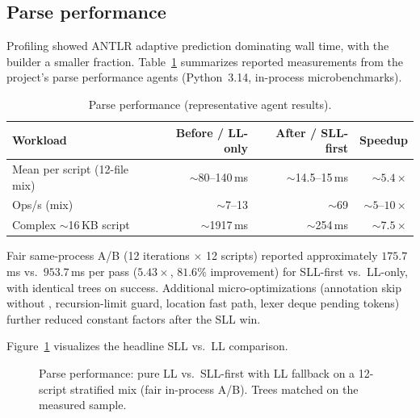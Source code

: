 \documentclass[11pt,a4paper]{article}
\begin{document}
\subsection{Parse performance}
\label{sec:eval-parse}

Profiling showed ANTLR adaptive prediction dominating wall time, with the
builder a smaller fraction. Table~\ref{tab:parse-perf} summarizes reported
measurements from the project's parse performance agents (Python~3.14,
in-process microbenchmarks).

\begin{table}[t]
\centering
\caption{Parse performance (representative agent results).}
\label{tab:parse-perf}
\small
\begin{tabular}{@{}lrrr@{}}
\toprule
Workload & Before / LL-only & After / SLL-first & Speedup \\
\midrule
Mean per script (12-file mix) & \(\sim\)80--140\,ms & \(\sim\)14.5--15\,ms & \(\sim 5.4\times\) \\
Ops/s (mix) & \(\sim\)7--13 & \(\sim\)69 & \(\sim 5\)--\(10\times\) \\
Complex \(\sim\)16\,KB script & \(\sim\)1917\,ms & \(\sim\)254\,ms & \(\sim 7.5\times\) \\
\bottomrule
\end{tabular}
\end{table}

Fair same-process A/B (12 iterations \(\times\) 12 scripts) reported approximately
\(175.7\)\,ms vs.\ \(953.7\)\,ms per pass (\(5.43\times\), \(81.6\%\) improvement)
for SLL-first vs.\ LL-only, with identical trees on success.
Additional micro-optimizations (annotation skip without , recursion-limit
guard, location fast path, lexer deque pending tokens) further reduced constant
factors after the SLL win.

Figure~\ref{fig:sll-ll} visualizes the headline SLL vs.\ LL comparison.

\begin{figure}[t]
\centering
{}
\caption{Parse performance: pure LL vs.\ SLL-first with LL fallback on a
12-script stratified mix (fair in-process A/B). Trees matched on the measured
sample.}
\label{fig:sll-ll}
\end{figure}
\end{document}
